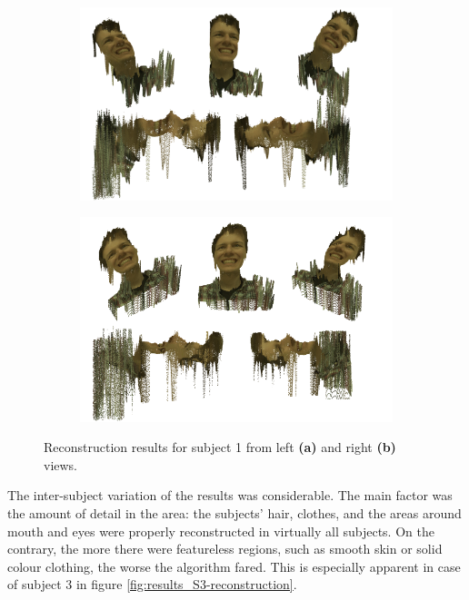 \documentclass[journal]{IEEEtran}
\begin{document}
\begin{figure}
    \centering
    \begin{subfigure}[t]{\linewidth}
        \centering
        \includegraphics[width=\linewidth]{result_S1_R}
		\caption{}
		\label{fig:result_S1_R}
    \end{subfigure}
    
    \begin{subfigure}[t]{\linewidth}
        \centering
		\includegraphics[width=\linewidth]{result_S1_L}
		\caption{}
		\label{fig:result_S1_L}
    \end{subfigure}
    
    \caption{Reconstruction results for subject 1 from left \textbf{(a)} and right \textbf{(b)} views.}
    \label{fig:results-reconstruction}

\end{figure}

The inter-subject variation of the results was considerable. The main factor was the amount of detail in the area: the subjects' hair, clothes, and the areas around mouth and eyes were properly reconstructed in virtually all subjects. 
On the contrary, the more there were featureless regions, such as smooth skin or solid colour clothing, the worse the algorithm fared. 
This is especially apparent in case of subject 3 in figure \ref{fig:results_S3-reconstruction}.
\end{document}
